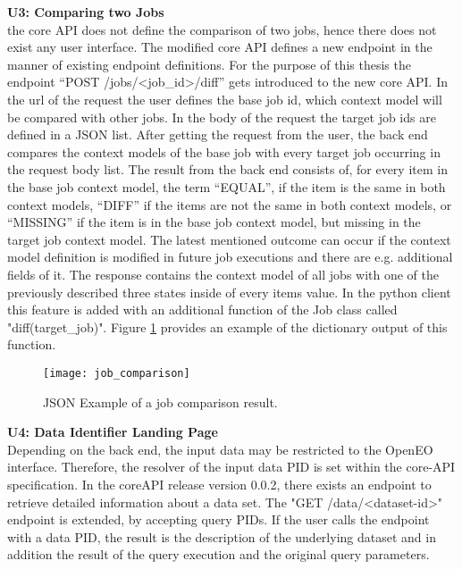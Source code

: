 \documentclass[draft,final]{vutinfth} %
\begin{document}
\textbf{U3: Comparing two Jobs} \\
the core API does not define the comparison of two jobs, hence there does not exist any user interface. The modified core API defines a new endpoint in the manner of existing endpoint definitions. For the purpose of this thesis the endpoint  “POST /jobs/<job\_id>/diff” gets introduced to the new core API. In the url of the request the user defines the base job id, which context model will be compared with other jobs. In the body of the request the target job ids are defined in a JSON list. After getting the request from the user, the back end compares the context models of the base job with every target job occurring in the request body list. The result from the back end consists of, for every item in the base job context model, the term “EQUAL”, if the item is the same in both context models, “DIFF” if the items are not the same in both context models, or “MISSING” if the item is in the base job context model, but missing in the target job context model. The latest mentioned outcome can occur if the context model definition is modified in future job executions and there are e.g. additional fields of it. The response contains the context model of all jobs with one of the previously described three states inside of every items value. In the python client this feature is added with an additional function of the Job class called "diff(target\_job)". Figure \ref{fig:job_comparison} provides an example of the dictionary output of this function.

\begin{figure}[h]
	\centering
	\texttt{[image: job\_comparison]}
	\caption{JSON Example of a job comparison result.}
	\label{fig:job_comparison} %
\end{figure}


\textbf{U4: Data Identifier Landing Page} \\
Depending on the back end, the input data may be restricted to the OpenEO interface. Therefore, the resolver of the input data PID is set within the core-API specification. In the coreAPI release version 0.0.2, there exists an endpoint to retrieve detailed information about a data set. The "GET /data/<dataset-id>" endpoint is extended, by accepting query PIDs. If the user calls the endpoint with a data PID, the result is the description of the underlying dataset and in addition the result of the query execution and the original query parameters.
\end{document}
